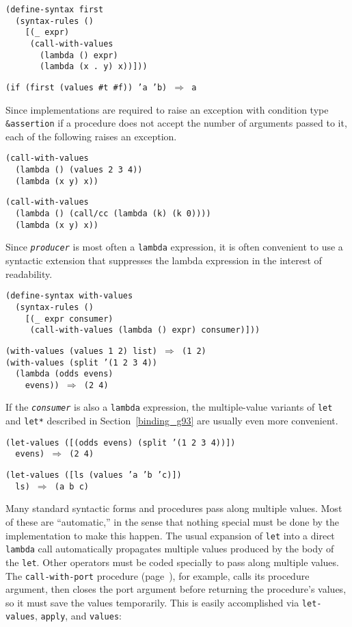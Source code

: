 \begin{alltt}
(define-syntax first
  (syntax-rules ()
    [(\_{} expr)
     (call-with-values
       (lambda () expr)
       (lambda (x . y) x))]))

(if (first (values \#{}t \#{}f)) 'a 'b) \(\Rightarrow\) a
\end{alltt}


Since implementations are required to raise an exception with condition
type \texttt{\&{}assertion} if a procedure does not accept the number of
arguments passed to it, each of the following raises an exception.


\begin{alltt}
(call-with-values
  (lambda () (values 2 3 4))
  (lambda (x y) x))

(call-with-values
  (lambda () (call/cc (lambda (k) (k 0))))
  (lambda (x y) x))
\end{alltt}


Since \texttt{\textit{producer}} is most often a \texttt{lambda} expression, it
is often convenient to use a syntactic extension that suppresses
the lambda expression in the interest of readability.


\begin{alltt}
(define-syntax with-values
  (syntax-rules ()
    [(\_{} expr consumer)
     (call-with-values (lambda () expr) consumer)]))

(with-values (values 1 2) list) \(\Rightarrow\) (1 2)
(with-values (split '(1 2 3 4))
  (lambda (odds evens)
    evens)) \(\Rightarrow\) (2 4)
\end{alltt}


If the \texttt{\textit{consumer}} is also a \texttt{lambda} expression, the
multiple-value variants of \texttt{let} and \texttt{let*} described
in Section \ref{binding_g93} are usually even more
convenient.\label{control_s78}\label{control_s79}


\begin{alltt}
(let-values ([(odds evens) (split '(1 2 3 4))])
  evens) \(\Rightarrow\) (2 4)

(let-values ([ls (values 'a 'b 'c)])
  ls) \(\Rightarrow\) (a b c)
\end{alltt}


Many standard syntactic forms and procedures  pass along multiple values.
Most of these are ``automatic,'' in the sense that nothing special
must be done by the implementation to make this happen.
The usual expansion of \texttt{let} into a direct
\texttt{lambda} call automatically propagates multiple
values produced by the body of the \texttt{let}.
Other operators must be coded specially to pass along multiple
values.
The \texttt{call-with-port} procedure (page \pageref{io_g127}),
for example, calls its procedure argument, then closes the port argument
before returning the procedure's values, so it must save the values
temporarily.
This is easily accomplished via \texttt{let-values},
\texttt{apply}, and \texttt{values}:


